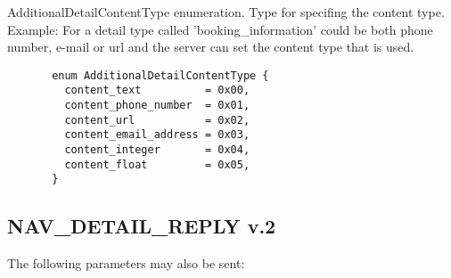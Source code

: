 \documentclass[a4paper]{article}
\begin{document}
\label{additionaldetailcontentenum}
AdditionalDetailContentType enumeration. Type for specifing the content type. 
Example: For a detail type called 'booking\_information' could be both phone
number, e-mail or url and the server can set the content type that is used.

\begin{verbatim}
       enum AdditionalDetailContentType {
         content_text          = 0x00,
         content_phone_number  = 0x01,
         content_url           = 0x02,
         content_email_address = 0x03,
         content_integer       = 0x04,
         content_float         = 0x05,
       }
\end{verbatim}

 

\subsection{NAV\_DETAIL\_REPLY v.2}

The following parameters may also be sent:
\end{document}
